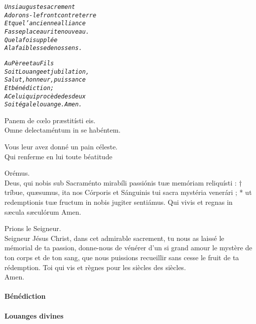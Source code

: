 \documentclass[twoside]{article}
\begin{document}
\newpage
\begin{paracol}{2}

\begin{alltt}\normalfont
\emph{Un si auguste sacrement
Adorons-le front contre terre
Et que l'ancienne alliance
Fasse place au rite nouveau.
Que la foi supplée
A la faiblesse de nos sens.}
\end{alltt}

\switchcolumn

\begin{alltt}\normalfont
\emph{Au Père et au Fils
Soit Louange et jubilation,
Salut, honneur, puissance
Et bénédiction;
A Celui qui procède des deux
Soit égale louange. Amen.}
\end{alltt}

\switchcolumn*

\vv Panem de cœlo præstitísti eis.\\
\rr Omne delectaméntum in se habéntem.

\switchcolumn

\vv Vous leur avez donné un pain céleste.\\
\rr Qui renferme en lui toute béatitude

\switchcolumn*

\vv Orémus. \\
Deus, qui nobis sub Sacraménto mirabíli passiónis tuæ memóriam reliquísti : † tríbue,
quæsumus, ita nos Córporis et Sánguinis tui
sacra mystéria venerári ; * ut redemptionis
tuæ fructum in nobis jugiter sentiámus. 
Qui vivis et regnas in sæcula sæculórum
\rr Amen.

\switchcolumn

\vv Prions le Seigneur.\\
Seigneur Jésus Christ, dans cet admirable sacrement, tu nous as laissé le mémorial de ta passion, donne-nous de vénérer d'un si grand amour le mystère de ton corps et de ton sang, que nous puissions recueillir sans cesse le fruit de ta rédemption. Toi qui vis et règnes pour les siècles des siècles.\\
\rr Amen.

\end{paracol}

\paragraph{Bénédiction}

\paragraph{Louanges divines}
\end{document}
